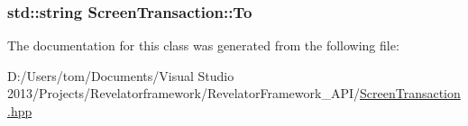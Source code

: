 \hypertarget{class_screen_transaction_acadac834d980c73ac6084fb52a7f882c}{
\subsubsection[{To}]{\setlength{\rightskip}{0pt plus 5cm}std\-::string Screen\-Transaction\-::\-To\hspace{0.3cm}{\ttfamily [protected]}}}\label{class_screen_transaction_acadac834d980c73ac6084fb52a7f882c}


The documentation for this class was generated from the following file\-:\begin{DoxyCompactItemize}
\item 
D\-:/\-Users/tom/\-Documents/\-Visual Studio 2013/\-Projects/\-Revelatorframework/\-Revelator\-Framework\-\_\-\-A\-P\-I/\hyperlink{_screen_transaction_8hpp}{Screen\-Transaction.\-hpp}\end{DoxyCompactItemize}
